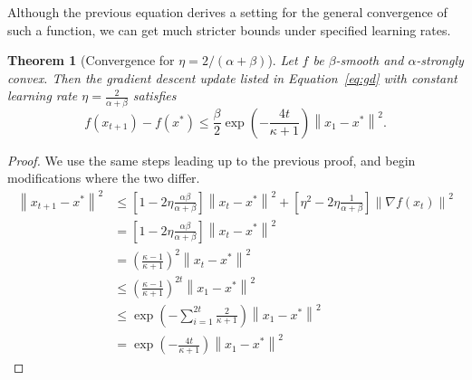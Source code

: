 \documentclass{article}
\newcommand{\norm}[1]{\left\| #1 \right\| }
\newtheorem{theorem}{Theorem}
\theoremstyle{definition}
\begin{document}
Although the previous equation derives a setting for the general convergence of
such a function, we can get much stricter bounds under specified learning rates.

\begin{theorem}[Convergence for $\eta = 2 / (\alpha + \beta)$]
    Let $f$ be $\beta$-smooth and $\alpha$-strongly convex. Then the
    gradient descent update listed in Equation~\ref{eq:gd} with constant learning rate
    $\eta = \frac{2}{\alpha + \beta} $ satisfies
    \begin{equation}
        f(x_{t+1}) - f(x^*) \leq \frac{\beta}{2} \exp \left( - \frac{4t}{\kappa
        + 1} \right) \norm{x_1 - x^*}^2.
    \end{equation}
\end{theorem}

\begin{proof}
    We use the same steps leading up to the previous proof, and begin
    modifications where the two differ.
    \begin{equation}
        \begin{aligned}
            \norm{x_{t + 1} - x^*}^2 
            &\leq \left[ 1 - 2\eta \frac{\alpha \beta}{\alpha + \beta}
            \right]\norm{x_t - x^*}^2 + \left[  \eta^2  - 2\eta\frac{1}{\alpha +
            \beta} \right]\norm{\nabla f(x_t)}^2\\
            &= \left[ 1 - 2\eta \frac{\alpha \beta}{\alpha + \beta}
            \right]\norm{x_t - x^*}^2 \\
            &= {\left( \frac{\kappa - 1}{\kappa + 1} 
            \right)}^2\norm{x_t - x^*}^2 \\
            &\leq {\left( \frac{\kappa - 1}{\kappa + 1} 
            \right)}^{2t}\norm{x_1 - x^*}^2 \\
            &\leq \exp \left( -\sum_{i = 1}^{2t} \frac{2}{\kappa
        + 1} \right) \norm{x_1 - x^*}^2 \\
            &= \exp \left( - \frac{4t}{\kappa
        + 1} \right) \norm{x_1 - x^*}^2
        \end{aligned}
    \end{equation}
\end{proof}



\end{document}
